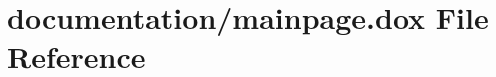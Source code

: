 \hypertarget{mainpage_8dox}{}\section{documentation/mainpage.dox File Reference}
\label{mainpage_8dox}
